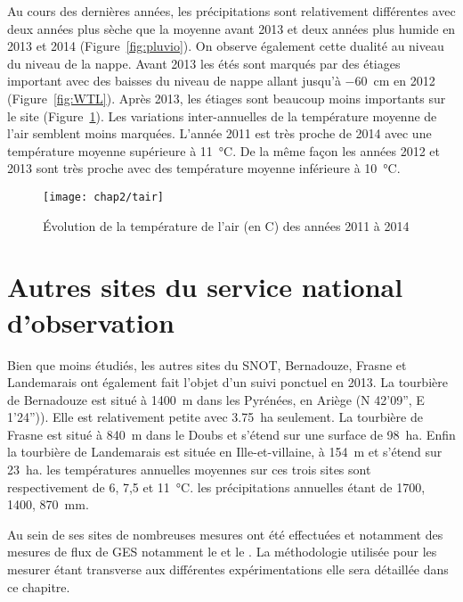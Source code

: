 Au cours des dernières années, les précipitations sont relativement différentes avec deux années plus sèche que la moyenne avant 2013 et deux années plus humide en 2013 et 2014 (Figure~\ref{fig:pluvio}).
On observe également cette dualité au niveau du niveau de la nappe.
Avant 2013 les étés sont marqués par des étiages important avec des baisses du niveau de nappe allant jusqu'à \SI{-60}{\cm} en 2012 (Figure~\ref{fig:WTL}).
Après 2013, les étiages sont beaucoup moins importants sur le site (Figure~\ref{fig:tair}).
Les variations inter-annuelles de la température moyenne de l'air semblent moins marquées.
L'année 2011 est très proche de 2014 avec une température moyenne supérieure à \SI{11}{\degreeCelsius}.
De la même façon les années 2012 et 2013 sont très proche avec des température moyenne inférieure à  \SI{10}{\degreeCelsius}.


\begin{figure}
\centering
\texttt{[image: chap2/tair]}
\caption{Évolution de la température de l'air (en \textdegree C) des années 2011 à 2014}
\label{fig:tair}
\end{figure}




\section{Autres sites du service national d'observation}

Bien que moins étudiés, les autres sites du SNOT, Bernadouze, Frasne et Landemarais ont également fait l'objet d'un suivi ponctuel en 2013.
La tourbière de Bernadouze est situé à \SI{1400}{\metre} dans les Pyrénées, en Ariège (N 42’09”, E 1’24”)).
Elle est relativement petite avec \SI{3.75}{\hectare} seulement.
La tourbière de Frasne est situé à \SI{840}{\metre} dans le Doubs et s'étend sur une surface de \SI{98}{\hectare}.
Enfin la tourbière de Landemarais est située en Ille-et-villaine, à \SI{154}{\metre} et s'étend sur \SI{23}{\hectare}.
les températures annuelles moyennes sur ces trois sites sont respectivement de 6, 7,5 et \SI{11}{\degreeCelsius}.
les précipitations annuelles étant de \num{1700}, \num{1400}, \SI{870}{\milli\meter}.

Au sein de ses sites de nombreuses mesures ont été effectuées et notamment des mesures de flux de GES notamment le \coo et le \chh. La méthodologie utilisée pour les mesurer étant transverse aux différentes expérimentations elle sera détaillée dans ce chapitre.

